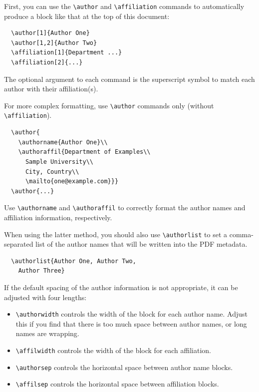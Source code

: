 \documentclass[preprint]{../latex/sigchi-modern}
\begin{document}
First, you can use the \texttt{\textbackslash author} and 
\texttt{\textbackslash affiliation} commands to automatically produce a block
like that at the top of this document:
\begin{verbatim}
  \author[1]{Author One}
  \author[1,2]{Author Two}
  \affiliation[1]{Department ...}
  \affiliation[2]{...}
\end{verbatim}
The optional argument to each command is the superscript symbol to match each
author with their affiliation(s).

For more complex formatting, use
\texttt{\textbackslash author} commands only (without
\texttt{\textbackslash affiliation}).
\begin{verbatim}
  \author{
    \authorname{Author One}\\
    \authoraffil{Department of Examples\\
      Sample University\\
      City, Country\\
      \mailto{one@example.com}}}
  \author{...}
\end{verbatim}
Use \texttt{\textbackslash authorname} and \texttt{\textbackslash authoraffil}
to correctly format the author names and affiliation information, respectively.

When using the latter method, you should also use
\texttt{\textbackslash author\-list} to set a comma-separated list of
the author names that will be written into the PDF metadata.
\begin{verbatim}
  \authorlist{Author One, Author Two, 
    Author Three}
\end{verbatim}

If the default spacing of the author information is not appropriate, it can be
adjusted with four lengths:
\begin{itemize}
  \item \texttt{\textbackslash authorwidth} controls the width of the block
    for each author name.
    Adjust this if you find that there is too much space between author names,
    or long names are wrapping.
  \item \texttt{\textbackslash affilwidth} controls the width of the block
    for each affiliation.
  \item \texttt{\textbackslash authorsep} controls the horizontal space
    between author name blocks.
  \item \texttt{\textbackslash affilsep} controls the horizontal space between
    affiliation blocks.
\end{itemize}
\end{document}
